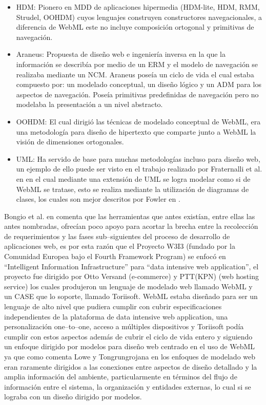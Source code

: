 \documentclass[oneside,12pt,a4paper]{memoir}%
\begin{document}
	\begin{itemize}
	  \item HDM: Pionero en \ac{MDD} de aplicaciones hipermedia (HDM-lite, HDM,
	  RMM, Strudel, OOHDM) cuyos lenguajes construyen constructores
	  navegacionales, a diferencia de \ac{WebML} este no incluye composici\'on
	  ortogonal y primitivas de navegaci\'on.
	  \item Araneus: Propuesta de dise\~no web e ingenier\'ia inversa
	  en la que la informaci\'on se describ\'ia por medio de un \ac{ERM} y el
	  modelo de navegaci\'on se realizaba mediante un \ac{NCM}.
	  Araneus pose\'ia un ciclo de vida el cual estaba compuesto por: un modelado
	  conceptual, un dise\~no l\'ogico y un \ac{ADM} para los
	  aspectos de navegaci\'on.
	  Pose\'ia primitivas predefinidas de navegaci\'on pero no modelaba la
	  presentaci\'on a un nivel abstracto.
	  \item OOHDM: El cual dirigi\'o las t\'ecnicas de modelado conceptual de
	  \ac{WebML}, era una metodolog\'ia para dise\~no de hipertexto que comparte
	  junto a \ac{WebML} la visi\'on de dimensiones ortogonales.
	  \item \ac{UML}: Ha servido de base para muchas metodolog\'ias incluso para
	  dise\~no web, un ejemplo de ello puede ser visto en el trabajo realizado por
	  Fraternalli et al. en \cite{Moreno2006} en el cual mediante una extensi\'on
	  de \ac{UML} se logra modelar como si de \ac{WebML} se tratase, esto se
	  realiza mediante la utilizaci\'on de diagramas de clases, los cuales son
	  mejor descritos por Fowler en \cite{Fowler2003}.
	\end{itemize}
	 
	Bongio et al. en \cite{Ceri2000} comenta que las herramientas que antes exist\'ian, entre
	ellas las antes nombradas, ofrec\'ian poco apoyo para acortar la brecha entre la
	recolecci\'on de requerimientos y las fases sub--siguientes del proceso de
	desarrollo de aplicaciones web, es por esta raz\'on que el Proyecto \ac{W3I3} 
	(fundado por la Comunidad Europea bajo el Fourth Framework Program) se enfoc\'o
	en ``Intelligent Information Infrastructure'' para ``data intensive web
	application'', el proyecto fue dirigido por Otto Versand (e-commerce) y
	PTT(KPN) (web hosting service) los cuales produjeron un lenguaje de modelado
	web llamado \ac{WebML} y un \ac{CASE} que lo soporte, llamado Toriisoft.
	\ac{WebML} estaba dise\~nado para ser un lenguaje de alto nivel que pudiera
	cumplir con cubrir especificaciones independientes de la plataforma de data
	intensive web application, una personalizaci\'on one--to--one, acceso a
	m\'ultiples dispositivos y Toriisoft pod\'ia cumplir con estos aspectos
	adem\'as de cubrir el ciclo de vida entero y siguiendo un enfoque dirigido por
	modelos para dise\~no web centrado en el uso de \ac{WebML} ya que como comenta
	Lowe y Tongrungrojana en \cite{Lowe2003} los enfoques de modelado web eran
	raramente dirigidos a las conexiones entre aspectos de dise\~no detallado y la
	amplia informaci\'on del ambiente, particularmente en t\'erminos del flujo de
	informaci\'on entre el sistema, la organizaci\'on y entidades externas, lo cual
	si se lograba con un dise\~no dirigido por modelos.
\end{document}
